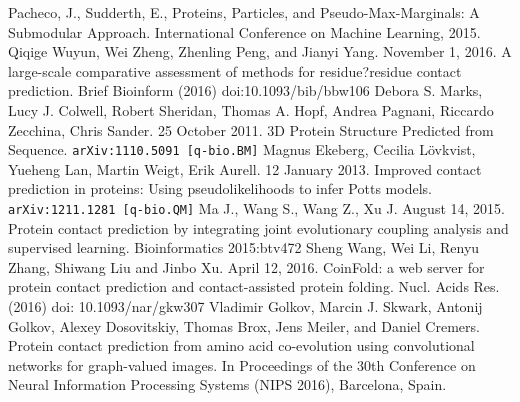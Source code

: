 \documentclass{article}
\begin{document}
\begin{thebibliography}{9}
{\setlength\itemsep{0.0em}
  Pacheco, J., Sudderth, E.,
  Proteins, Particles, and Pseudo-Max-Marginals: A Submodular Approach.
  International Conference on Machine Learning, 2015.
	Qiqige Wuyun, Wei Zheng, Zhenling Peng, and Jianyi Yang. November 1, 2016. A large-scale comparative assessment of methods for residue?residue contact prediction. Brief Bioinform (2016) doi:10.1093/bib/bbw106
	Debora S. Marks, Lucy J. Colwell, Robert Sheridan, Thomas A. Hopf, Andrea Pagnani, Riccardo Zecchina, Chris Sander. 25 October 2011. 3D Protein Structure Predicted from Sequence. {\tt arXiv:1110.5091 [q-bio.BM]}
	Magnus Ekeberg, Cecilia L{\"o}vkvist, Yueheng Lan, Martin Weigt, Erik Aurell. 12 January 2013. Improved contact prediction in proteins: Using pseudolikelihoods to infer Potts models. {\tt arXiv:1211.1281 [q-bio.QM]}
	 Ma J., Wang S., Wang Z., Xu J. August 14, 2015. Protein contact prediction by integrating joint evolutionary coupling analysis and supervised learning. Bioinformatics 2015:btv472
	Sheng Wang,  Wei Li, Renyu Zhang, Shiwang Liu and Jinbo Xu. April 12, 2016. CoinFold: a web server for protein contact prediction and contact-assisted protein folding. Nucl. Acids Res. (2016) doi: 10.1093/nar/gkw307
	Vladimir Golkov, Marcin J. Skwark, Antonij Golkov, Alexey Dosovitskiy, Thomas Brox, Jens Meiler, and Daniel Cremers. Protein contact prediction from amino acid co-evolution using convolutional networks for graph-valued images. In Proceedings of the 30th Conference on Neural Information Processing Systems (NIPS 2016), Barcelona, Spain.
}
\end{thebibliography}
\end{document}

